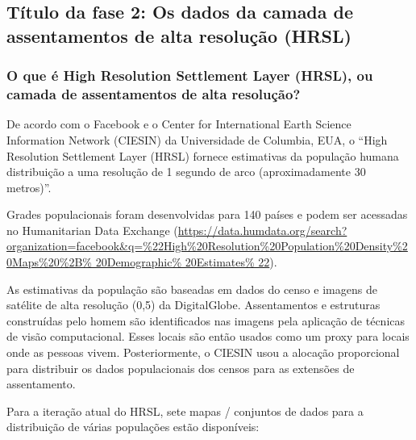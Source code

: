 \documentclass[
]{book}
\begin{document}
\hypertarget{tuxedtulo-da-fase-2-os-dados-da-camada-de-assentamentos-de-alta-resoluuxe7uxe3o-hrsl}{%
\subsection{Título da fase 2: Os dados da camada de assentamentos de alta resolução (HRSL)}\label{tuxedtulo-da-fase-2-os-dados-da-camada-de-assentamentos-de-alta-resoluuxe7uxe3o-hrsl}}

\hypertarget{o-que-uxe9-high-resolution-settlement-layer-hrsl-ou-camada-de-assentamentos-de-alta-resoluuxe7uxe3o}{%
\subsubsection{\texorpdfstring{\textbf{O que é High Resolution Settlement Layer (HRSL), ou camada de assentamentos de alta resolução?}}{O que é High Resolution Settlement Layer (HRSL), ou camada de assentamentos de alta resolução?}}\label{o-que-uxe9-high-resolution-settlement-layer-hrsl-ou-camada-de-assentamentos-de-alta-resoluuxe7uxe3o}}

De acordo com o Facebook e o Center for International Earth Science Information Network (CIESIN) da Universidade de Columbia, EUA, o ``High Resolution Settlement Layer (HRSL) fornece estimativas da população humana distribuição a uma resolução de 1 segundo de arco (aproximadamente 30 metros)''.

Grades populacionais foram desenvolvidas para 140 países e podem ser acessadas no Humanitarian Data Exchange (\href{https://data.humdata.org/search?organization=facebook\&q=\%22High\%20Resolution\%20Population\%20Density\%20Maps\%20\%2B\%20Demographic\%20Estimates\%22}{https://data.humdata.org/search?organization=facebook\&q=\%22High\%20Resolution\%20Population\%20Density\%20Maps\%20\%2B\% 20Demographic\% 20Estimates\% 22}).

As estimativas da população são baseadas em dados do censo e imagens de satélite de alta resolução (0,5) da DigitalGlobe. Assentamentos e estruturas construídas pelo homem são identificados nas imagens pela aplicação de técnicas de visão computacional. Esses locais são então usados como um proxy para locais onde as pessoas vivem. Posteriormente, o CIESIN usou a alocação proporcional para distribuir os dados populacionais dos censos para as extensões de assentamento.

Para a iteração atual do HRSL, sete mapas / conjuntos de dados para a distribuição de várias populações estão disponíveis:
\end{document}
